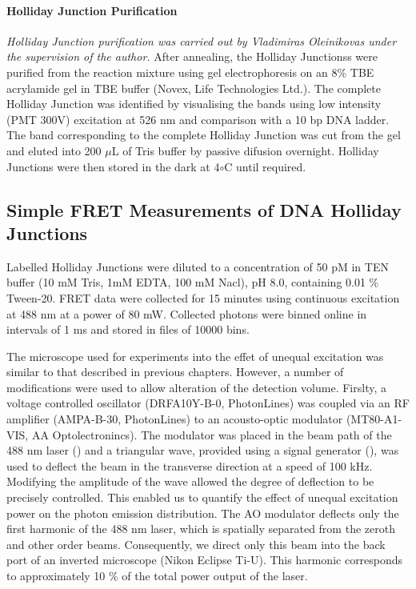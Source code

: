 \paragraph{Holliday Junction Purification}
\emph{Holliday Junction purification was carried out by Vladimiras Oleinikovas under the supervision of the author.}
After annealing, the Holliday Junctionss were purified from the reaction mixture using gel electrophoresis on an 8\% TBE acrylamide gel in TBE buffer (Novex, Life Technologies Ltd.). The complete Holliday Junction was identified by visualising the bands using low intensity (PMT 300V) excitation at 526 nm and comparison with a 10 bp DNA ladder. The band corresponding to the complete Holliday Junction was cut from the gel and eluted into 200 $\mu$L of Tris buffer by passive difusion overnight. Holliday Junctions were then stored in the dark at 4$\circ$C until required.

\subsection{Simple FRET Measurements of DNA Holliday Junctions}
Labelled Holliday Junctions were diluted to a concentration of 50 pM in TEN buffer (10 mM Tris, 1mM EDTA, 100 mM Nacl), pH 8.0, containing 0.01 \% Tween-20. FRET data were collected for 15 minutes using continuous excitation at 488 nm at a power of 80 mW. Collected photons were binned online in intervals of 1 ms and stored in files of 10000 bins. 

The microscope used for experiments into the effet of unequal excitation was similar to that described in previous chapters. However, a number of modifications were used to allow alteration of the detection volume. Firslty, a voltage controlled oscillator (DRFA10Y-B-0, PhotonLines) was coupled via an RF amplifier (AMPA-B-30, PhotonLines) to an acousto-optic modulator (MT80-A1-VIS, AA Optolectronincs). The modulator was placed in the beam path of the 488 nm laser () and a triangular wave, provided using a signal generator (), was used to deflect the beam in the transverse direction at a speed of 100 kHz. Modifying the amplitude of the wave allowed the degree of deflection to be precisely controlled. This enabled us to quantify the effect of unequal excitation power on the photon emission distribution. The AO modulator deflects only the first harmonic of the 488 nm laser, which is spatially separated from the zeroth and other order beams. Consequently, we direct only this beam into the back port of an inverted microscope (Nikon Eclipse Ti-U). This harmonic corresponds to approximately 10 \% of the total power output of the laser.

